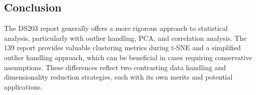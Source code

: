 \subsection*{Conclusion}
The DS203 report generally offers a more rigorous approach to statistical analysis, particularly with outlier handling, PCA, and correlation analysis. The 139 report provides valuable clustering metrics during t-SNE and a simplified outlier handling approach, which can be beneficial in cases requiring conservative assumptions. These differences reflect two contrasting data handling and dimensionality reduction strategies, each with its own merits and potential applications.